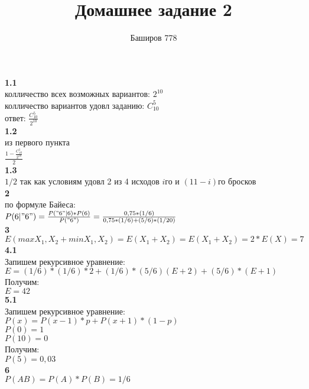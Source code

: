 \documentclass[a4paper,12pt]{article}
\author{Баширов 778}
\title{Домашнее задание 2}
\begin{document}
\maketitle
\newpage

\large\textbf{1.1}\normalsize\\
колличество всех возможных вариантов: $2^{10}$\\
колличество вариантов удовл заданию: $C_{10}^5$\\
ответ: $\frac{C_{10}^5}{2^{10}}$\\

\large\textbf{1.2}\normalsize\\
из первого пункта\\
$\frac{1 - \frac{C_{10}^5}{2^{10}}}{2}$\\

\large\textbf{1.3}\normalsize\\
$1/2$ так как условиям удовл 2 из 4 исходов $i$го и $(11-i)$го бросков\\

\large\textbf{2}\normalsize\\
по формуле Байеса:\\
$P(6|"6") = \frac{P("6"\mid6)*P(6)}{P("6")} = \frac{0,75*(1/6)}{0,75*(1/6)+(5/6)*(1/20)}$\\

\large\textbf{3}\normalsize\\
$E(max{X_{1},X_{2}}+min{X_{1},X_{2}}) = E(X_{1}+X_{2}) = E(X_{1}+X_{2}) = 2*E(X) = 7$\\

\large\textbf{4.1}\normalsize\\
Запишем рекурсивное уравнение:\\
$E = (1/6)*(1/6)*2 + (1/6)*(5/6)(E + 2) + (5/6)*(E + 1)$\\
Получим:\\
$E = 42 $\\

\large\textbf{5.1}\normalsize\\
Запишем рекурсивное уравнение:\\
$P(x) = P(x-1)*p + P(x+1)*(1-p)$\\
$P(0) = 1$\\
$P(10) = 0$\\
Получим:\\
$P(5)=0,03$\\

\large\textbf{6}\normalsize\\
$P(AB) = P(A)*P(B) = 1/6$
\end{document}
